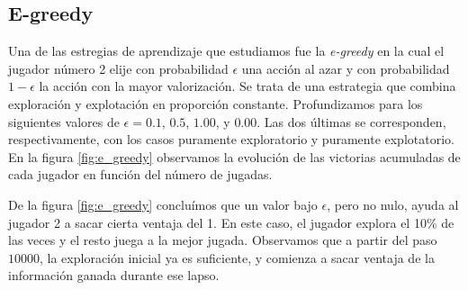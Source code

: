 \documentclass[11pt, spanish]{article}
\begin{document}
\subsection{E-greedy}
\par Una de las estregias de aprendizaje que estudiamos fue la \emph{e-greedy} 
en la cual el jugador número 2 elije con probabilidad $\epsilon$ una acción al 
azar y con probabilidad $1-\epsilon$ la acción con la mayor valorización. Se 
trata de una estrategia que combina exploración y explotación en proporción 
constante. Profundizamos para los siguientes valores de $\epsilon = 
0.1$, $0.5$, $1.00$, y $0.00$. Las dos últimas se corresponden, respectivamente, 
con los casos puramente exploratorio y puramente explotatorio. En la figura 
\ref{fig:e_greedy} observamos la evolución de las victorias acumuladas de cada 
jugador en función del número de jugadas.
\par De la figura \ref{fig:e_greedy} concluímos que un valor bajo $\epsilon$, 
pero no nulo, ayuda al jugador 2 a sacar cierta ventaja del 1. En este caso, el 
jugador explora el 10\% de las veces y el resto juega a la mejor jugada. 
Observamos que a partir del paso $10000$, la exploración inicial ya es 
suficiente, y comienza a sacar ventaja de la información ganada durante ese 
lapso. 
\end{document}
